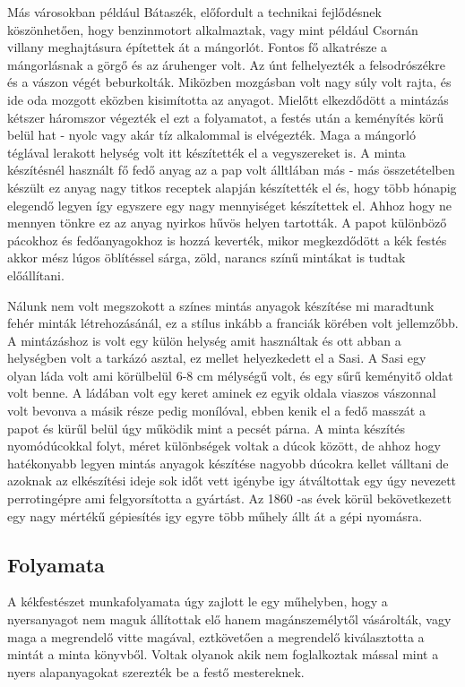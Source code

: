 \documentclass[fontsize=12pt, appendixprefix=true]{scrreprt}
\begin{document}
Más városokban például Bátaszék, előfordult a technikai fejlődésnek köszönhetően, hogy benzinmotort alkalmaztak, vagy mint például Csornán villany meghajtásura építettek át a mángorlót. Fontos fő alkatrésze a mángorlásnak a görgő és az áruhenger volt. Az únt felhelyezték a felsodrószékre és a vászon végét beburkolták. Miközben mozgásban volt nagy súly volt rajta, és ide oda mozgott eközben kisimította az anyagot. Mielőtt elkezdődött a mintázás kétszer háromszor végezték el ezt a folyamatot, a festés után a keményítés körű belül hat - nyolc  vagy akár tíz alkalommal is elvégezték. Maga a mángorló téglával lerakott helység volt itt készítették el a vegyszereket is. 
A minta készítésnél használt fő fedő anyag az a pap volt álltlában más - más összetételben készült ez anyag nagy titkos receptek alapján készítették el és, hogy több hónapig elegendő legyen így egyszere egy nagy mennyiséget készítettek el.  Ahhoz hogy ne mennyen tönkre ez az anyag nyirkos hűvös helyen tartották. A papot különböző  pácokhoz és fedőanyagokhoz is hozzá keverték, mikor megkezdődött a kék festés akkor mész lúgos öblítéssel sárga, zöld, narancs színű mintákat is tudtak előállítani.

Nálunk nem volt megszokott a  színes mintás anyagok készítése mi maradtunk fehér minták létrehozásánál, ez a stílus inkább a franciák körében volt jellemzőbb. A mintázáshoz is volt egy külön helység amit használtak és ott abban a helységben volt a tarkázó asztal, ez mellet helyezkedett el a Sasi.
A Sasi egy olyan láda volt ami körülbelül 6-8 cm mélységű volt, és egy sűrű keményitő oldat volt benne. A ládában volt egy keret aminek ez egyik oldala viaszos vászonnal volt bevonva a másik része pedig monílóval, ebben kenik el a fedő masszát a papot és kürűl belül úgy működik mint a pecsét párna.
A minta készítés nyomódúcokkal folyt, méret különbségek voltak a dúcok között, de ahhoz hogy hatékonyabb legyen mintás anyagok készítése nagyobb dúcokra kellet válltani de azoknak az elkészítési ideje sok időt vett igénybe igy átváltottak egy úgy nevezett perrotingépre ami  felgyorsította a gyártást. Az 1860 -as évek körül bekövetkezett egy nagy mértékű gépiesítés igy egyre több műhely állt át a gépi nyomásra.

\subsection{Folyamata}

A kékfestészet munkafolyamata úgy zajlott le egy műhelyben, hogy a nyersanyagot nem maguk állítottak elő hanem magánszemélytől vásárolták,  vagy maga a megrendelő vitte magával, eztkövetően a megrendelő kiválasztotta a mintát a minta könyvből. 
Voltak olyanok akik nem foglalkoztak mással mint a nyers alapanyagokat szerezték be a festő mestereknek.
\end{document}

